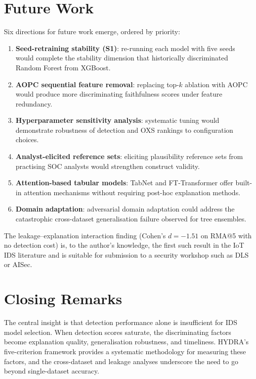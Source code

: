 \documentclass[12pt,a4paper]{report}
\begin{document}
\section{Future Work}
\label{sec:future}

Six directions for future work emerge, ordered by priority:

\begin{enumerate}
  \item \textbf{Seed-retraining stability (S1)}: re-running each model with five seeds would complete the stability dimension that historically discriminated Random Forest from XGBoost.
  \item \textbf{AOPC sequential feature removal}: replacing top-$k$ ablation with AOPC would produce more discriminating faithfulness scores under feature redundancy.
  \item \textbf{Hyperparameter sensitivity analysis}: systematic tuning would demonstrate robustness of detection and OXS rankings to configuration choices.
  \item \textbf{Analyst-elicited reference sets}: eliciting plausibility reference sets from practising SOC analysts would strengthen construct validity.
  \item \textbf{Attention-based tabular models}: TabNet and FT-Transformer offer built-in attention mechanisms without requiring post-hoc explanation methods.
  \item \textbf{Domain adaptation}: adversarial domain adaptation could address the catastrophic cross-dataset generalisation failure observed for tree ensembles.
\end{enumerate}

The leakage--explanation interaction finding (Cohen's $d = -1.51$ on RMA@5 with no detection cost) is, to the author's knowledge, the first such result in the IoT IDS literature and is suitable for submission to a security workshop such as DLS or AISec.

\section{Closing Remarks}
\label{sec:closing}

The central insight is that detection performance alone is insufficient for IDS model selection. When detection scores saturate, the discriminating factors become explanation quality, generalisation robustness, and timeliness. HYDRA's five-criterion framework provides a systematic methodology for measuring these factors, and the cross-dataset and leakage analyses underscore the need to go beyond single-dataset accuracy.
\end{document}
